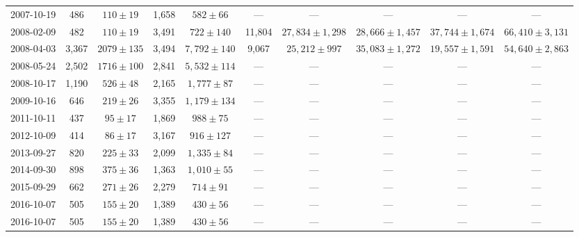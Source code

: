\begin{landscape}
\begin{longtable}{cccccccccc}
{2007-10-19} & 486 & {$110  \pm  19$} & 1,658 & {$582 \pm 66$} & --- & --- & --- & --- & --- \\
{2008-02-09} & 482 & {$110  \pm  19$} & 3,491 & {$722 \pm 140$} & 11,804 & {$27,834 \pm 1,298$} & {$28,666 \pm 1,457$} & {$37,744 \pm 1,674$} & {$66,410 \pm 3,131$} \\
{2008-04-03} & 3,367 & {$2079  \pm  135$} & 3,494 & {$7,792 \pm 140$} & 9,067 & {$25,212 \pm 997$} & {$35,083 \pm 1,272$} & {$19,557 \pm 1,591$} & {$54,640 \pm 2,863$} \\
{2008-05-24} & 2,502 & {$1716  \pm  100$} & 2,841 & {$5,532 \pm 114$} & --- & --- & --- & --- & --- \\
{2008-10-17} & 1,190 & {$526  \pm  48$} & 2,165 & {$1,777 \pm 87$} & --- & --- & --- & --- & --- \\
{2009-10-16} & 646 & {$219  \pm  26$} & 3,355 & {$1,179 \pm 134$} & --- & --- & --- & --- & --- \\
{2011-10-11} & 437 & {$95  \pm  17$} & 1,869 & {$988 \pm 75$} & --- & --- & --- & --- & --- \\
{2012-10-09} & 414 & {$86  \pm  17$} & 3,167 & {$916 \pm 127$} & --- & --- & --- & --- & --- \\
{2013-09-27} & 820 & {$225  \pm  33$} & 2,099 & {$1,335 \pm 84$} & --- & --- & --- & --- & --- \\
{2014-09-30} & 898 & {$375  \pm  36$} & 1,363 & {$1,010 \pm 55$} & --- & --- & --- & --- & --- \\
{2015-09-29} & 662 & {$271  \pm  26$} & 2,279 & {$714 \pm 91$} & --- & --- & --- & --- & --- \\
{2016-10-07} & 505 & {$155  \pm  20$} & 1,389 & {$430 \pm 56$} & --- & --- & --- & --- & --- \\
{2016-10-07} & 505 & {$155  \pm  20$} & 1,389 & {$430 \pm 56$} & --- & --- & --- & --- & --- \\
\end{longtable} 
\end{landscape} 
